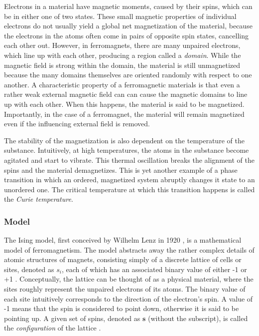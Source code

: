 \documentclass[12pt]{article}
\begin{document}
Electrons in a material have magnetic moments, caused by their spins, which can be in either one of two states. These small magnetic properties of individual electrons do not usually yield a global net magnetization of the material, because the electrons in the atoms often come in pairs of opposite spin states, cancelling each other out. However, in ferromagnets, there are many unpaired electrons, which line up with each other, producing a region called a \textit{domain}. While the magnetic field is strong within the domain, the material is still unmagnetized because the many domains themselves are oriented randomly with respect to one another. A characteristic property of a ferromagnetic materials is that even a rather weak external magnetic field can can cause the magnetic domains to line up with each other. When this happens, the material is said to be magnetized. Importantly, in the case of a ferromagnet, the material will remain magnetized even if the influencing external field is removed. 

The stability of the magnetization is also dependent on the temperature of the substance. Intuitively, at high temperatures, the atoms in the substance become agitated and start to vibrate. This thermal oscillation breaks the alignment of the spins and the material demagnetizes. This is yet another example of a phase transition in which an ordered, magnetized system abruptly changes it state to an unordered one. The critical temperature at which this transition happens is called the \textit{Curie temperature}.

\subsubsection{Model} 

The Ising model, first conceived by Wilhelm Lenz in 1920 \cite{ising-history}, is a mathematical model of ferromagnetism. The model abstracts away the rather complex details of atomic structures of magnets, consisting simply of a discrete lattice of cells or sites, denoted as $s_i$, each of which has an associated binary value of either -1 or +1 \cite{statistical-mechanics}. Conceptually, the lattice can be thought of as a physical material, where the sites roughly represent the unpaired electrons of its atoms. The binary value of each site intuitively corresponds to the direction of the electron's spin. A value of -1 means that the spin is considered to point down, otherwise it is said to be pointing up. A given set of spins, denoted as $\boldsymbol{s}$ (without the subscript), is called the \textit{configuration} of the lattice \cite{statistical-mechanics}.
\end{document}
